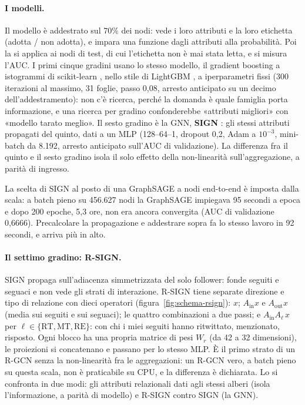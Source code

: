 \documentclass[11pt,a4paper]{article}
\begin{document}
\paragraph{I modelli.} Il modello è addestrato sul 70\% dei nodi: vede i loro attributi e la loro etichetta (adotta / non adotta), e impara una funzione dagli attributi alla probabilità. Poi la si applica ai nodi di test, di cui l'etichetta non è mai stata letta, e si misura l'AUC. I primi cinque gradini usano lo stesso modello, il gradient boosting a istogrammi di scikit-learn \citep{pedregosa2011}, nello stile di LightGBM \citep{ke2017}, a iperparametri fissi (300 iterazioni al massimo, 31 foglie, passo 0,08, arresto anticipato su un decimo dell'addestramento): non c'è ricerca, perché la domanda è quale famiglia porta informazione, e una ricerca per gradino confonderebbe «attributi migliori» con «modello tarato meglio». Il sesto gradino è la GNN, \textbf{SIGN} \citep{frasca2020}: gli stessi attributi propagati del quinto, dati a un MLP (128--64--1, dropout 0,2, Adam a $10^{-3}$, mini-batch da 8.192, arresto anticipato sull'AUC di validazione). La differenza fra il quinto e il sesto gradino isola il solo effetto della non-linearità sull'aggregazione, a parità di ingresso.

La scelta di SIGN al posto di una GraphSAGE a nodi end-to-end è imposta dalla scala: a batch pieno su 456.627 nodi la GraphSAGE impiegava 95 secondi a epoca e dopo 200 epoche, 5,3 ore, non era ancora convergita (AUC di validazione 0,6666). Precalcolare la propagazione e addestrare sopra fa lo stesso lavoro in 92 secondi, e arriva più in alto.

\paragraph{Il settimo gradino: R-SIGN.} SIGN propaga sull'adiacenza simmetrizzata del solo follower: fonde seguiti e seguaci e non vede gli strati di interazione. R-SIGN tiene separate direzione e tipo di relazione con dieci operatori (figura~\ref{fig:schema-rsign}): $x$; $A_{\mathrm{in}} x$ e $A_{\mathrm{out}} x$ (media sui seguiti e sui seguaci); le quattro combinazioni a due passi; e $A_{\mathrm{in}} A_{\ell}\, x$ per $\ell \in \{\mathrm{RT},\mathrm{MT},\mathrm{RE}\}$: con chi i miei seguiti hanno ritwittato, menzionato, risposto. Ogni blocco ha una propria matrice di pesi $W_r$ (da 42 a 32 dimensioni), le proiezioni si concatenano e passano per lo stesso MLP. È il primo strato di un R-GCN \citep{schlichtkrull2018} senza la non-linearità fra le aggregazioni: un R-GCN vero, a batch pieno su questa scala, non è praticabile su CPU, e la differenza è dichiarata. Lo si confronta in due modi: gli attributi relazionali dati agli stessi alberi (isola l'informazione, a parità di modello) e R-SIGN contro SIGN (la GNN).
\end{document}
